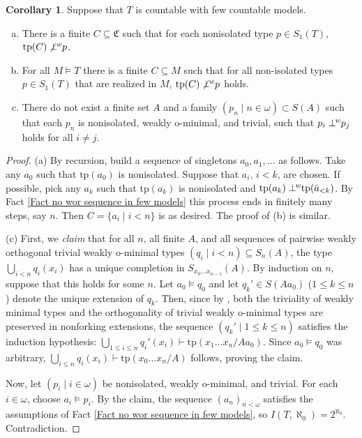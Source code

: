 \documentclass{amsart}
\theoremstyle{definition}
\newtheorem{Corollary}[Theorem]{Corollary}
\theoremstyle{definition}
\newcommand{\wor}{\perp\hspace*{-0.4em}^{\mathit w}}
\newcommand{\nwor}{\not\perp\hspace*{-0.4em}^{\mathit w}}
\newcommand{\Mon}{\mathfrak C}
\newcommand{\tp}{\mathrm{tp}}
\begin{document}
\begin{Corollary}\label{Corollary no strongly orthogonal sequence} Suppose that $T$ is countable with few countable models.
    \begin{enumerate}[(a)]
        \item There is a finite $C\subseteq\Mon$ such that for each nonisolated type $p\in S_1(T)$, $\tp(C)\nwor p$.
        \item For all $M\models T$ there is a finite $C\subseteq M$ such that for all non-isolated types $p\in S_1(T)$ that are realized in $M$, $\tp(C)\nwor p$ holds.
        \item There do not exist a finite set $A$ and a family $(p_n\mid n\in\omega)\subset S(A)$ such that each $p_n$ is nonisolated, weakly o-minimal, and trivial, such that $p_i\wor p_j$ holds for all $i\neq j$. 
    \end{enumerate}
\end{Corollary}
\begin{proof}
(a) By recursion, build a sequence of singletons $a_0,a_1,\dots$ as follows. Take any $a_0$ such that $\tp(a_0)$ is nonisolated. Suppose that $a_i$, $i<k$, are chosen. If possible, pick any $a_k$ such that $\tp(a_k)$ is nonisolated and $\tp(a_k)\wor\tp(\bar a_{<k})$. By Fact \ref{Fact no wor sequence in few models} this process ends in finitely many steps, say $n$. Then $C=\{a_i\mid i<n\}$ is as desired. The proof of (b) is similar. 

(c) First, we {\em claim} that for all $n$, all finite $A$, and all sequences of pairwise weakly orthogonal trivial weakly o-minimal types $(q_i\mid i<n)\subseteq S_n(A)$, the type $\bigcup_{i<n}q_i(x_i)$ has a unique completion in $S_{x_0\dots x_{n-1}}(A)$. 
By induction on $n$, suppose that this holds for some $n$. Let $a_0\models q_0$ and let $q_k'\in S(Aa_0)$ ($1\leqslant k\leqslant n$) denote the unique extension of $q_k$. Then, since by \cite[Theorem 5.10]{MTwqom1}, both the triviality of weakly minimal types and the orthogonality of trivial weakly o-minimal types are preserved in nonforking extensions, 
the sequence $(q_k'\mid 1\leqslant k\leqslant n)$ 
satisfies the induction hypothesis: $\bigcup_{1\leqslant i\leqslant n}q_i'(x_i)\vdash \tp(x_1\ldots x_n/Aa_0)$. 
Since $a_0\models q_0$ was arbitrary, $\bigcup_{i\leqslant n}q_i(x_i)\vdash \tp(x_0\ldots x_n/A)$ follows, proving the claim. 

Now, let $(p_i\mid i\in\omega)$ be nonisolated, weakly o-minimal, and trivial. For each $i\in\omega$, choose $a_i\models p_i$. By the claim, the sequence $(a_n)_{n<\omega}$ satisfies the assumptions of Fact \ref{Fact no wor sequence in few models}, so $I(T,\aleph_0)=2^{\aleph_0}$. Contradiction.  \end{proof}
\end{document}
